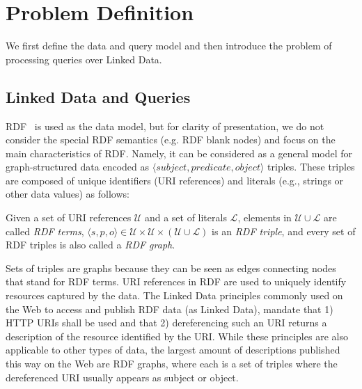 \section{Problem Definition}
\label{sec:problem}
We first define the data and query model and then
introduce the problem of processing queries over Linked Data.

\subsection{Linked Data and Queries} 
RDF~\cite{klyne_resource_2004} is used as the data model, but for
clarity of presentation, we do not consider the special RDF semantics
(e.g. RDF blank nodes) and focus on the main characteristics of RDF.
Namely, it can be considered as a general model for
graph-structured data encoded as $\langle subject, predicate, object
\rangle$ triples. These triples are composed of unique identifiers
(URI references) and literals (e.g., strings or other data values) as
follows:
\begin{definition}
  Given a set of URI references $\mathcal{U}$ and a set of literals
  $\mathcal{L}$, elements in $\mathcal{U} \cup \mathcal{L}$ are called
  \emph{RDF terms}, $\langle s, p, o\rangle \in \mathcal{U} \times
  \mathcal{U} \times (\mathcal{U} \cup \mathcal{L})$ is an \emph{RDF
    triple}, and every set of RDF triples is also called a \emph{RDF
    graph}.
\end{definition}
Sets of triples are graphs because they can be seen as edges
connecting nodes that stand for RDF terms. URI references in RDF are
used to uniquely identify resources captured by the data.
The Linked Data principles \cite{bizer_linked_2009} commonly used on
the Web to access and publish RDF data (as Linked Data), mandate that
1) HTTP URIs shall be used and that 2) dereferencing such an URI
returns a description of the resource identified by the URI. While
these principles are also applicable to other types of data, the
largest amount of descriptions published this way on the Web are RDF
graphs, where each is a set of triples where the dereferenced URI
usually appears as subject or object.

